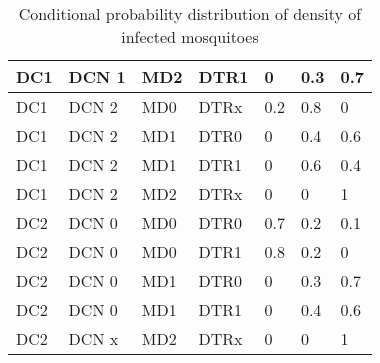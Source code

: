 \documentclass[a4paper,9pt,nil]{article}
\begin{document}
\begin{table}[!htbp]
\begin{tabular}{|l|l|l|l|l|l|l|}
			\hline
				DC1 & DCN 1 & MD2 & DTR1 & 0 & 0.3 & 0.7\\
			\hline
				DC1 & DCN 2 & MD0 & DTRx & 0.2 & 0.8 & 0\\
			\hline
				DC1 & DCN 2 & MD1 & DTR0 & 0 & 0.4 & 0.6\\
			\hline
				DC1 & DCN 2 & MD1 & DTR1 & 0 & 0.6 & 0.4\\
			\hline
				DC1 & DCN 2 & MD2 & DTRx & 0 & 0 & 1\\
			\hline
				DC2 & DCN 0 & MD0 & DTR0 & 0.7 & 0.2 & 0.1\\
			\hline
				DC2 & DCN 0 & MD0 & DTR1 & 0.8 & 0.2 & 0\\
			\hline
				DC2 & DCN 0 & MD1 & DTR0 & 0 & 0.3 & 0.7\\
			\hline
				DC2 & DCN 0 & MD1 & DTR1 & 0 & 0.4 & 0.6\\
			\hline
				DC2 & DCN x & MD2 & DTRx & 0 & 0 & 1\\
			\hline
		\end{tabular}
		\caption{Conditional probability distribution of density of infected mosquitoes}
	\end{table}
	
	
\end{document}
